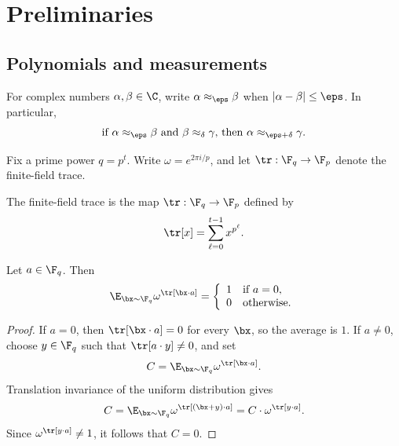 \chapter{Preliminaries}
\label{chap:preliminaries}
\label{sec:prelims}

\section{Polynomials and measurements}

For complex numbers $\alpha,\beta \in \C$, write $\alpha \approx_\eps \beta$ when $|\alpha-\beta|\le \eps$. In particular,
\begin{equation}\label{eq:triangle-inequality-for-numbers}
	\text{if $\alpha \approx_{\eps} \beta$ and $\beta \approx_{\delta} \gamma$, then $\alpha \approx_{\eps+\delta}\gamma$.}
\end{equation}

Fix a prime power $q=p^t$. Write $\omega=e^{2\pi i/p}$, and let $\tr:\F_q\to\F_p$ denote the finite-field trace.

\begin{definition}\label{def:ff-trace}
	\leanok
	The finite-field trace is the map $\tr:\F_q\to\F_p$ defined by
	\[
		\tr[x] = \sum_{\ell=0}^{t-1} x^{p^\ell}.
	\]
\end{definition}

\begin{lemma}\label{prop:fourier-fact-scalar}
	\leanok
	Let $a \in \F_q$. Then
	\begin{equation*}
		\E_{\bx \sim \F_q} \omega^{\tr[\bx \cdot a]}
		= \left\{\begin{array}{rl}
			1 & \text{if $a = 0$}, \\
			0 & \text{otherwise}.
		\end{array}\right.
	\end{equation*}
\end{lemma}
\begin{proof}
	\leanok
	If $a=0$, then $\tr[\bx\cdot a]=0$ for every $\bx$, so the average is $1$. If $a\neq 0$, choose $y \in \F_q$ such that $\tr[a\cdot y]\neq 0$, and set
	\[
		C=\E_{\bx \sim \F_q} \omega^{\tr[\bx \cdot a]}.
	\]
	Translation invariance of the uniform distribution gives
	\[
		C=\E_{\bx \sim \F_q} \omega^{\tr[(\bx+y)\cdot a]}
		= C \cdot \omega^{\tr[y\cdot a]}.
	\]
	Since $\omega^{\tr[y\cdot a]}\neq 1$, it follows that $C=0$.
\end{proof}

